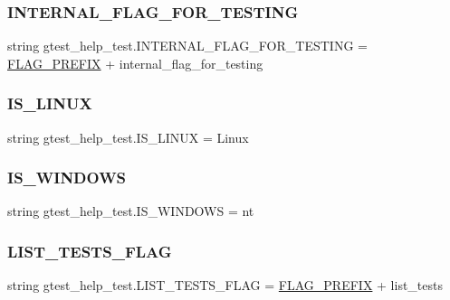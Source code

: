 \subsubsection{\texorpdfstring{INTERNAL\_FLAG\_FOR\_TESTING}{INTERNAL\_FLAG\_FOR\_TESTING}}
{\footnotesize\ttfamily string gtest\+\_\+help\+\_\+test.\+I\+N\+T\+E\+R\+N\+A\+L\+\_\+\+F\+L\+A\+G\+\_\+\+F\+O\+R\+\_\+\+T\+E\+S\+T\+I\+NG = \mbox{\hyperlink{namespacegtest__help__test_a9e357a76dd993057c826ec411c9a4b3c}{F\+L\+A\+G\+\_\+\+P\+R\+E\+F\+IX}} + \textquotesingle{}internal\+\_\+flag\+\_\+for\+\_\+testing\textquotesingle{}}

\mbox{\label{namespacegtest__help__test_ae61a149d50be253176a139fbe6712582}} 
\subsubsection{\texorpdfstring{IS\_LINUX}{IS\_LINUX}}
{\footnotesize\ttfamily string gtest\+\_\+help\+\_\+test.\+I\+S\+\_\+\+L\+I\+N\+UX = \textquotesingle{}Linux\textquotesingle{}}

\mbox{\label{namespacegtest__help__test_a0f8d4b00fc83b1e72bbb5eca5f3bc4d7}} 
\subsubsection{\texorpdfstring{IS\_WINDOWS}{IS\_WINDOWS}}
{\footnotesize\ttfamily string gtest\+\_\+help\+\_\+test.\+I\+S\+\_\+\+W\+I\+N\+D\+O\+WS = \textquotesingle{}nt\textquotesingle{}}

\mbox{\label{namespacegtest__help__test_a558dea5edfd6fdb48112401b257f5aea}} 
\subsubsection{\texorpdfstring{LIST\_TESTS\_FLAG}{LIST\_TESTS\_FLAG}}
{\footnotesize\ttfamily string gtest\+\_\+help\+\_\+test.\+L\+I\+S\+T\+\_\+\+T\+E\+S\+T\+S\+\_\+\+F\+L\+AG = \mbox{\hyperlink{namespacegtest__help__test_a9e357a76dd993057c826ec411c9a4b3c}{F\+L\+A\+G\+\_\+\+P\+R\+E\+F\+IX}} + \textquotesingle{}list\+\_\+tests\textquotesingle{}}

